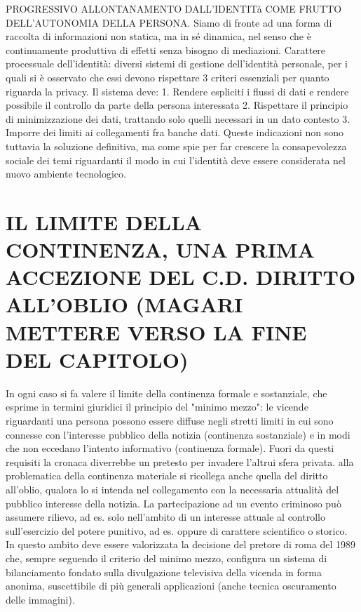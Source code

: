 PROGRESSIVO ALLONTANAMENTO DALL’IDENTITà COME FRUTTO DELL’AUTONOMIA DELLA PERSONA.
Siamo di fronte ad una forma di raccolta di informazioni non statica, ma in sé dinamica, nel senso che è continuamente produttiva di effetti senza bisogno di mediazioni.
Carattere processuale dell’identità: diversi sistemi di gestione dell’identità personale, per i quali si è osservato che essi devono rispettare 3 criteri essenziali per quanto riguarda la privacy. Il sistema deve:
1.	Rendere espliciti i flussi di dati e rendere possibile il controllo da parte della persona interessata
2.	Rispettare il principio di minimizzazione dei dati, trattando solo quelli necessari in un dato contesto
3.	Imporre dei limiti ai collegamenti fra banche dati.
Queste indicazioni non sono tuttavia la soluzione definitiva, ma come spie per far crescere la consapevolezza sociale dei temi riguardanti il modo in cui l’identità deve essere considerata nel nuovo ambiente tecnologico.

\section{IL LIMITE DELLA CONTINENZA, UNA PRIMA ACCEZIONE DEL C.D. DIRITTO ALL'OBLIO (MAGARI METTERE VERSO LA FINE DEL CAPITOLO)}
In ogni caso si fa valere il limite della continenza formale e sostanziale, che esprime in termini giuridici il principio del "minimo mezzo": le vicende riguardanti una persona possono essere diffuse negli stretti limiti in cui sono connesse con l'interesse pubblico della notizia (continenza sostanziale) e in modi che non eccedano l'intento informativo (continenza formale). Fuori da questi requisiti la cronaca diverrebbe un pretesto per invadere l'altrui sfera privata.
alla problematica della continenza materiale si ricollega anche quella del diritto all'oblio, qualora lo si intenda nel collegamento con la necessaria attualità del pubblico interesse della notizia. La partecipazione ad un evento criminoso
può assumere rilievo, ad es. solo nell'ambito di un interesse attuale al controllo sull'esercizio del potere punitivo, ad es. oppure di carattere scientifico o storico.
In questo ambito deve essere valorizzata la decisione del pretore di roma del 1989 che, sempre seguendo il criterio del minimo mezzo, configura un sistema di bilanciamento fondato sulla divulgazione televisiva della vicenda in forma anonima, suscettibile di più generali applicazioni (anche tecnica oscuramento delle immagini).

